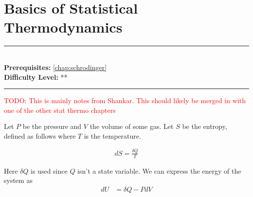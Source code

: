 \documentclass[book.tex]{subfiles}
\begin{document}
\chapter{Basics of Statistical Thermodynamics}

\label{chap:stat_thermo_basics}
\noindent\rule{11cm}{0.4pt} \\
\textbf{Prerequisites:}  \autoref{chap:schrodinger} \\
\textbf{Difficulty Level:} ** \\
\noindent\rule{11cm}{0.4pt}
\vspace{5mm}

\textcolor{red}{TODO: This is mainly notes from Shankar. This should likely be merged in with one of the other stat thermo chapters}

Let $P$ be the pressure and $V$ the volume of some gas. Let $S$ be the entropy, defined as follows where $T$ is the temperature.

\begin{align}
    dS = \frac{\delta Q}{T}
\end{align}

Here $\delta Q$ is used since $Q$ isn't a state variable. We can express the energy of the system as
\begin{align}
    dU &= \delta Q - P dV
\end{align}
\end{document}
